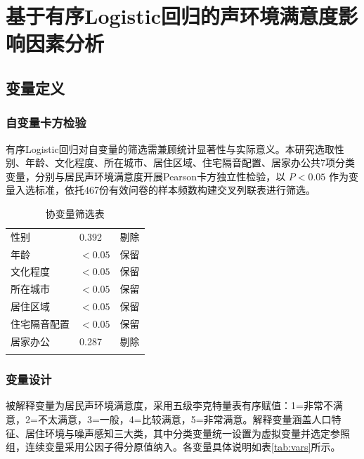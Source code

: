 \section{基于有序Logistic回归的声环境满意度影响因素分析}

\subsection{变量定义}

\subsubsection{自变量卡方检验}

有序Logistic回归对自变量的筛选需兼顾统计显著性与实际意义。本研究选取性别、年龄、文化程度、所在城市、居住区域、住宅隔音配置、居家办公共7项分类变量，分别与居民声环境满意度开展Pearson卡方独立性检验，以 $P<0.05$ 作为变量入选标准，依托467份有效问卷的样本频数构建交叉列联表进行筛选。

\begin{table}[H]
\centering
\caption{协变量筛选表}
\begin{tabular}{M{5cm}M{4cm}M{4cm}}
\bluetoprule
{}
 &  &  \\
\hline
性别 & 0.392 & 剔除 \\
年龄 & $<0.05$ & 保留 \\
文化程度 & $<0.05$ & 保留 \\
所在城市 & $<0.05$ & 保留 \\
居住区域 & $<0.05$ & 保留 \\
住宅隔音配置 & $<0.05$ & 保留 \\
居家办公 & 0.287 & 剔除 \\
\bluebottomrule
\end{tabular}
\end{table}

\subsubsection{变量设计}

被解释变量为居民声环境满意度，采用五级李克特量表有序赋值：1=非常不满意，2=不太满意，3=一般，4=比较满意，5=非常满意。解释变量涵盖人口特征、居住环境与噪声感知三大类，其中分类变量统一设置为虚拟变量并选定参照组，连续变量采用公因子得分原值纳入。各变量具体说明如表\ref{tab:vars}所示。

